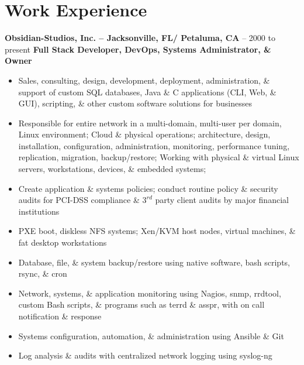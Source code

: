 \documentclass[10pt]{report}
\begin{document}
\section*{Work Experience}
\textbf{Obsidian-Studios, Inc. – Jacksonville, FL/ Petaluma, CA} – 2000 to present\newline
\textbf{Full Stack Developer, DevOps, Systems Administrator, \& Owner}
\begin{itemize}
  \item Sales, consulting, design, development, deployment, administration, \& support of custom SQL databases,
Java \& C applications (CLI, Web, \& GUI), scripting, \& other custom software solutions for businesses
  \item Responsible for entire network in a multi-domain, multi-user per domain, Linux environment; Cloud \&
physical operations; architecture, design, installation, configuration, administration, monitoring,
performance tuning, replication, migration, backup/restore; Working with physical \& virtual Linux
servers, workstations, devices, \& embedded systems;
  \item Create application \& systems policies; conduct routine policy \& security audits for PCI-DSS compliance
\& $3^{rd}$ party client audits by major financial institutions
  \item PXE boot, diskless NFS systems; Xen/KVM host nodes, virtual machines, \& fat desktop workstations
  \item Database, file, \& system backup/restore using native software, bash scripts, rsync, \& cron
  \item Network, systems, \& application monitoring using Nagios, snmp, rrdtool, custom Bash scripts, \&
programs such as terrd \& asspr, with on call notification \& response
  \item Systems configuration, automation, \& administration using Ansible \& Git
  \item Log analysis \& audits with centralized network logging using syslog-ng
\end{itemize}
\end{document}
